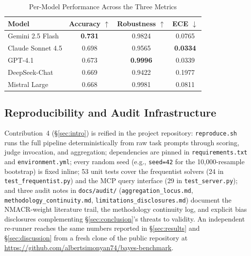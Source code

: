 \begin{table}[H]
\centering
\caption{Per-Model Performance Across the Three Metrics}
\label{tab:per-model}
\begin{tabular}{lccc}
\toprule
\textbf{Model} & \textbf{Accuracy $\uparrow$} & \textbf{Robustness $\uparrow$} & \textbf{ECE $\downarrow$} \\
\midrule
Gemini 2.5 Flash  & \textbf{0.731} & 0.9824 & 0.0765 \\
Claude Sonnet 4.5 & 0.698 & 0.9565 & \textbf{0.0334} \\
GPT-4.1           & 0.673 & \textbf{0.9996} & 0.0339 \\
DeepSeek-Chat     & 0.669 & 0.9422 & 0.1977 \\
Mistral Large     & 0.668 & 0.9981 & 0.0811 \\
\bottomrule
\end{tabular}
\end{table}

\subsection{Reproducibility and Audit Infrastructure}
\label{sec:reproducibility}

Contribution~4 (\S\ref{sec:intro}) is reified in the project
repository: \texttt{reproduce.sh} runs the full pipeline
deterministically from raw task prompts through scoring, judge
invocation, and aggregation; dependencies are pinned in
\texttt{requirements.txt} and \texttt{environment.yml}; every
random seed (e.g., \texttt{seed=42} for the 10{,}000-resample
bootstrap) is fixed inline; 53 unit tests cover the frequentist
solvers (24 in \texttt{test\_frequentist.py}) and the MCP query
interface (29 in \texttt{test\_server.py}); and three audit notes
in \texttt{docs/audit/} (\texttt{aggregation\_locus.md},
\texttt{methodology\_continuity.md},
\texttt{limitations\_disclosures.md}) document the NMACR-weight
literature trail, the methodology continuity log, and explicit
bias disclosures complementing \S\ref{sec:conclusion}'s threats to
validity. An independent re-runner reaches the same numbers
reported in \S\ref{sec:results} and \S\ref{sec:discussion} from a
fresh clone of the public repository at
\url{https://github.com/albertsimonyan74/bayes-benchmark}.

